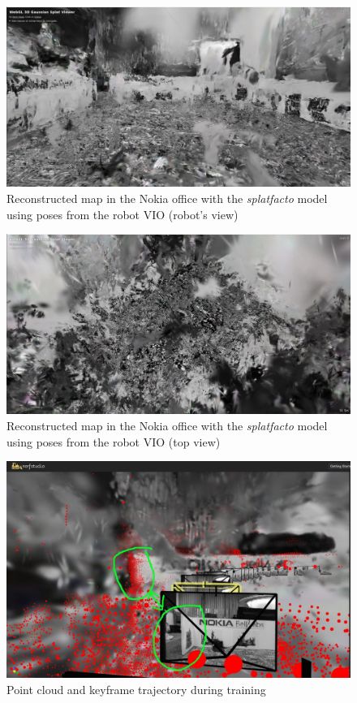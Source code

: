 \begin{figure}[htbp]
	\centering
	\includegraphics[width=150mm, keepaspectratio]{figures_jpg/nokia_splatfacto_ours1.jpg}
	\caption{Reconstructed map in the Nokia office with the \textit{splatfacto} model using poses from the robot VIO (robot's view)}
	\label{fig:nokia_splatfacto_ours_1}
\end{figure}

\begin{figure}[htbp]
	\centering
	\includegraphics[width=150mm, keepaspectratio]{figures_jpg/nokia_splatfacto_ours2.jpg}
	\caption{Reconstructed map in the Nokia office with the \textit{splatfacto} model using poses from the robot VIO (top view)}
	\label{fig:nokia_splatfacto_ours_2}
\end{figure}

\begin{figure}[htbp]
	\centering
	\includegraphics[width=150mm, keepaspectratio]{figures_jpg/trajectory_and_pointcloud_debug.jpg}
	\caption{Point cloud and keyframe trajectory during training}
	\label{fig:trajectory_and_pointcloud}
\end{figure}

